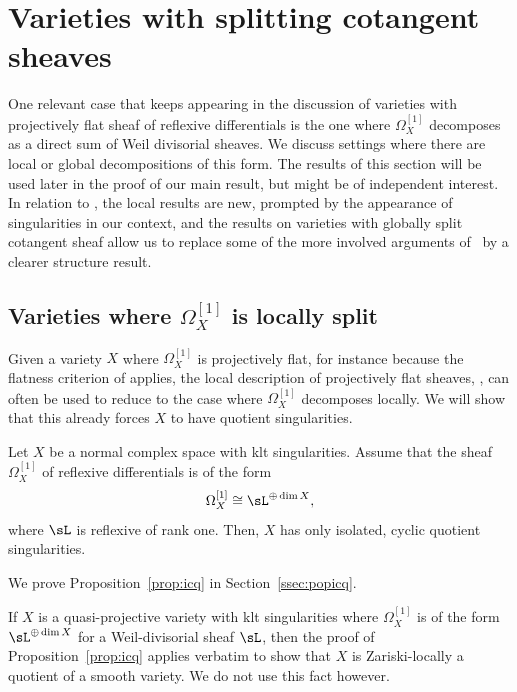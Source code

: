 \section{Varieties with splitting cotangent sheaves}
\label{sec:4}

One relevant case that keeps appearing in the discussion of varieties with
projectively flat sheaf of reflexive differentials is the one where $\Omega^{[1]}_X$
decomposes as a direct sum of Weil divisorial sheaves. We discuss settings
where there are local or global decompositions of this form. The results of
this section will be used later in the proof of our main result, but might be of
independent interest. In relation to \cite{MR3030068}, the local results are
new, prompted by the appearance of singularities in our context, and the results
on varieties with globally split cotangent sheaf allow us to replace some of the
more involved arguments of \loccit\ by a clearer structure result.

\subsection{Varieties where $\Omega^{[1]}_X$ is locally split}
\label{sect:split}

Given a variety $X$ where $\Omega^{[1]}_X$ is projectively flat, for instance because
the flatness criterion of \cite[Th.\,1.6]{GKP20a} applies, the local description
of projectively flat sheaves, \cite[Prop.\,3.11]{GKP20a}, can often be used to
reduce to the case where $\Omega^{[1]}_X$ decomposes locally. We will show that this
already forces $X$ to have quotient singularities.

\begin{prop}\label{prop:icq}
Let $X$ be a normal complex space with klt singularities. Assume that the
sheaf $\Omega^{[1]}_X$ of reflexive differentials is of the form
\begin{equation}\label{eq:icq}
\Omega^{[1]}_X \cong \sL^{\oplus \dim X},
\end{equation}
where $\sL$ is reflexive of rank one. Then, $X$ has only isolated, cyclic
quotient singularities.
\end{prop}

We prove Proposition~\ref{prop:icq} in Section~\vref{ssec:popicq}.

\begin{rem}
If $X$ is a quasi-projective variety with klt singularities where $\Omega^{[1]}_X$
is of the form $\sL^{\oplus \dim X}$ for a Weil-divisorial sheaf $\sL$, then the proof
of Proposition~\ref{prop:icq} applies verbatim to show that $X$ is
Zariski-locally a quotient of a smooth variety. We do not use this fact
however.
\end{rem}


